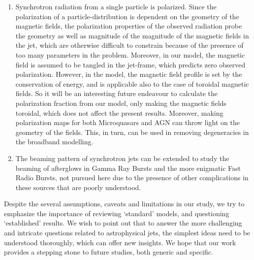 \begin{enumerate}
\item Synchrotron radiation from a single particle is polarized. Since the polarization of a particle-distribution is dependent on the geometry of the magnetic fields, the polarization properties of the observed radiation probe the geometry as well as magnitude of the magnitude of the magnetic fields in the jet, which are otherwise difficult to constrain because of the presence of too many parameters in the problem. Moreover, in our model, the magnetic field is assumed to be tangled in the jet-frame, which predicts zero observed polarization. However, in the \citealt{Blandford_&_Konigl-1979-ApJ} model, the magnetic field profile is set by the conservation of energy, and is applicable also to the case of toroidal magnetic fields. So it will be an interesting future endeavour to calculate the polarization fraction from our model, only making the magnetic fields toroidal, which does not affect the present results. Moreover, making polarization maps for both Microquasars and AGN can throw light on the geometry of the fields. This, in turn, can be used in removing degeneracies in the broadband modelling.

\item The beaming pattern of synchrotron jets can be extended to study the beaming of afterglows in Gamma Ray Bursts and the more enigmatic Fast Radio Bursts, not pursued here due to the presence of other complications in these sources that are poorly understood.

\end{enumerate}

Despite the several assumptions, caveats and limitations in our study, we try to emphasize the importance of reviewing `standard' models, and questioning `established' results. We wish to point out that to answer the more challenging and intricate questions related to astrophysical jets, the simplest ideas need to be understood thoroughly, which can offer new insights. We hope that our work provides a stepping stone to future studies, both generic and specific.






















%
%
%
%
%